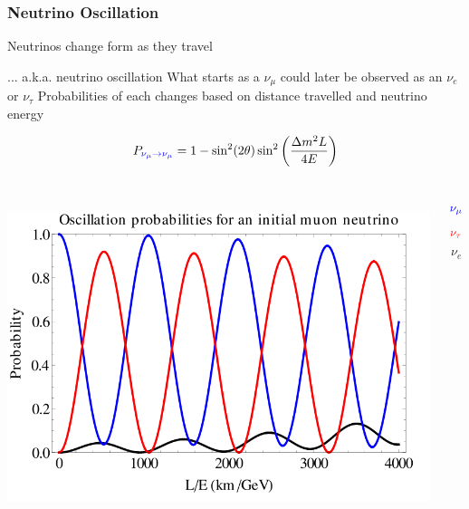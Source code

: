 \documentclass[10pt,professionalfonts,xcolor=table]{beamer}
\begin{document}
\frame
{
  \frametitle{Neutrino Oscillation}
  \begin{itemize}
  \bang Neutrinos change form as they travel
	  \begin{itemize}
	  \bing ... a.k.a. neutrino oscillation
	  \bing What starts as a $\nu_\mu$ could later be observed as an $\nu_e$ or $\nu_\tau$
	  \bing Probabilities of each changes based on distance travelled and neutrino energy
	  \end{itemize}
  \end{itemize}
\begin{center}
  \begin{equation*}
  P_{\color{blue}\nu_\mu \rightarrow \nu_\mu} = 1 - \sin^2(2\theta) \sin^2\bigg(\frac{\Delta m^2 L}{4 E}\bigg)
  \end{equation*}
\gap

  \begin{columns}[c]
    ~
  \includegraphics[width=1\textwidth]{figures/figures/osc_prob.png}
  \vspace{-70pt}

  \begin{equation*}
  \color{blue}
  \nu_\mu
  \end{equation*}
  \vspace{-20pt}
  \begin{equation*}
  \color{red}
  \nu_\tau
  \end{equation*}
  \vspace{-17pt}
  \begin{equation*}
  \nu_e
  \end{equation*}
  \gap
  ~

  \end{columns}


\end{center}


}
\end{document}
